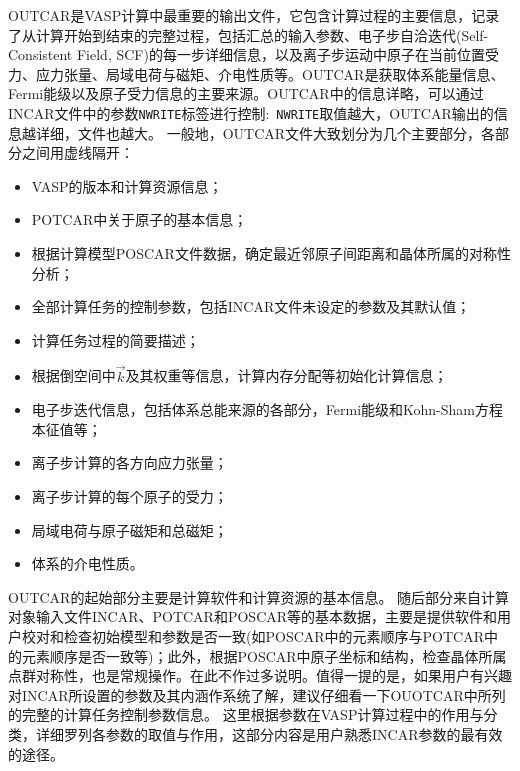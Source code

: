 \textrm{OUTCAR}是\textrm{VASP}计算中最重要的输出文件，它包含计算过程的主要信息，记录了从计算开始到结束的完整过程，包括汇总的输入参数、电子步自洽迭代{(Self-Consistent Field, SCF)}的每一步详细信息，以及离子步运动中原子在当前位置受力、应力张量、局域电荷与磁矩、介电性质等。\textrm{OUTCAR}是获取体系能量信息、\textrm{Fermi}能级以及原子受力信息的主要来源。\textrm{OUTCAR}中的信息详略，可以通过\textrm{INCAR}文件中的参数\texttt{NWRITE}标签进行控制:~\texttt{NWRITE}取值越大，\textrm{OUTCAR}输出的信息越详细，文件也越大。
一般地，\textrm{OUTCAR}文件大致划分为几个主要部分，各部分之间用虚线隔开：
\begin{itemize}
	\item \textrm{VASP}的版本和计算资源信息；
	\item \textrm{POTCAR}中关于原子的基本信息；
	\item 根据计算模型\textrm{POSCAR}文件数据，确定最近邻原子间距离和晶体所属的对称性分析；
	\item 全部计算任务的控制参数，包括\textrm{INCAR}文件未设定的参数及其默认值；
	\item 计算任务过程的简要描述；
	\item 根据倒空间中$\vec k$及其权重等信息，计算内存分配等初始化计算信息；
	\item 电子步迭代信息，包括体系总能来源的各部分，\textrm{Fermi}能级和\textrm{Kohn-Sham}方程本征值等；
	\item 离子步计算的各方向应力张量；
	\item 离子步计算的每个原子的受力；
	\item 局域电荷与原子磁矩和总磁矩；
	\item 体系的介电性质。
\end{itemize}
\textrm{OUTCAR}的起始部分主要是计算软件和计算资源的基本信息。
{\fontsize{8.2pt}{6.2pt}\selectfont{
}}
随后部分来自计算对象输入文件\textrm{INCAR}、\textrm{POTCAR}和\textrm{POSCAR}等的基本数据，主要是提供软件和用户校对和检查初始模型和参数是否一致(如\textrm{POSCAR}中的元素顺序与\textrm{POTCAR}中的元素顺序是否一致等)；此外，根据\textrm{POSCAR}中原子坐标和结构，检查晶体所属点群对称性，也是常规操作。在此不作过多说明。值得一提的是，如果用户有兴趣对\textrm{INCAR}所设置的参数及其内涵作系统了解，建议仔细看一下\textrm{OUOTCAR}中所列的完整的计算任务控制参数信息。
{\fontsize{8.2pt}{6.2pt}\selectfont{
}}
这里根据参数在\textrm{VASP}计算过程中的作用与分类，详细罗列各参数的取值与作用，这部分内容是用户熟悉\textrm{INCAR}参数的最有效的途径。

